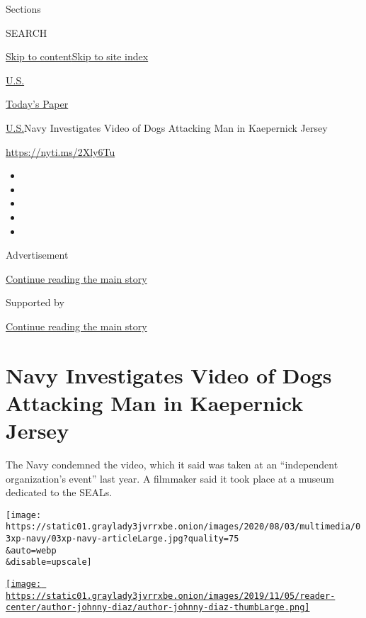 Sections

SEARCH

\protect\hyperlink{site-content}{Skip to
content}\protect\hyperlink{site-index}{Skip to site index}

\href{https://www.nytimes3xbfgragh.onion/section/us}{U.S.}

\href{https://myaccount.nytimes3xbfgragh.onion/auth/login?response_type=cookie\&client_id=vi}{}

\href{https://www.nytimes3xbfgragh.onion/section/todayspaper}{Today's
Paper}

\href{/section/us}{U.S.}\textbar{}Navy Investigates Video of Dogs
Attacking Man in Kaepernick Jersey

\href{https://nyti.ms/2Xly6Tu}{https://nyti.ms/2Xly6Tu}

\begin{itemize}
\item
\item
\item
\item
\item
\end{itemize}

Advertisement

\protect\hyperlink{after-top}{Continue reading the main story}

Supported by

\protect\hyperlink{after-sponsor}{Continue reading the main story}

\hypertarget{navy-investigates-video-of-dogs-attacking-man-in-kaepernick-jersey}{%
\section{Navy Investigates Video of Dogs Attacking Man in Kaepernick
Jersey}\label{navy-investigates-video-of-dogs-attacking-man-in-kaepernick-jersey}}

The Navy condemned the video, which it said was taken at an
``independent organization's event'' last year. A filmmaker said it took
place at a museum dedicated to the SEALs.

\texttt{[image: https://static01.graylady3jvrrxbe.onion/images/2020/08/03/multimedia/03xp-navy/03xp-navy-articleLarge.jpg?quality=75\\\&auto=webp\\\&disable=upscale]}

\href{https://www.nytimes3xbfgragh.onion/by/johnny-diaz}{\texttt{[image: https://static01.graylady3jvrrxbe.onion/images/2019/11/05/reader-center/author-johnny-diaz/author-johnny-diaz-thumbLarge.png]}}

